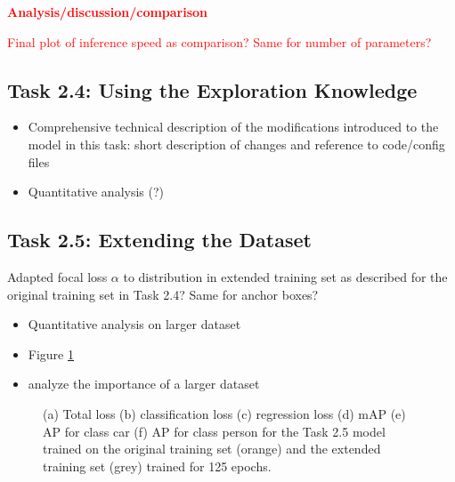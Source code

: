 \documentclass{article}
\begin{document}
\textbf{\textcolor{red}{Analysis/discussion/comparison}}

\textcolor{red}{Final plot of inference speed as comparison? Same for number of parameters?}

\newpage
\subsection*{Task 2.4: Using the Exploration Knowledge}
\begin{itemize}
    \item Comprehensive technical description of the modifications introduced to the model in this task: short description of changes and reference to code/config files
    \item Quantitative analysis (?)
\end{itemize}

\subsection*{Task 2.5: Extending the Dataset}
Adapted focal loss $\alpha$ to distribution in extended training set as described for the original training set in Task 2.4? Same for anchor boxes?

\begin{itemize}
    \item Quantitative analysis on larger dataset
    \item Figure \ref{fig:loss-2-5}
    \item analyze the importance of a larger dataset
\end{itemize}

\begin{figure}[t!]
    \centering
    \subfigure[]{}
    \vspace{-0.15cm}
    \subfigure[]{}
    \subfigure[]{}
    \subfigure[]{}
    \subfigure[]{}
    \subfigure[]{}
    \vspace{-0.4cm}
    \caption{(a) Total loss (b) classification loss (c) regression loss (d) mAP (e) AP for class car (f) AP for class person for the Task 2.5 model trained on the original training set (orange) and the extended training set (grey) trained for 125 epochs.}
    \label{fig:loss-2-5}
\end{figure}
\end{document}
